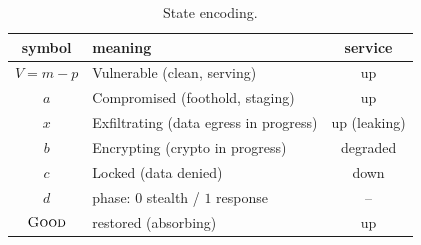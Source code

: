 \documentclass[journal]{IEEEtran}
\begin{document}
\begin{table}[t]
\caption{State encoding.}
\label{tab:states}
\centering\footnotesize
\begin{tabular}{@{}clc@{}}
\toprule
symbol & meaning & service\\
\midrule
$V=m-p$ & Vulnerable (clean, serving) & up\\
$a$ & Compromised (foothold, staging) & up\\
$x$ & Exfiltrating (data egress in progress) & up (leaking)\\
$b$ & Encrypting (crypto in progress) & degraded\\
$c$ & Locked (data denied) & down\\
$d$ & phase: $0$ stealth / $1$ response & --\\
$\textsc{Good}$ & restored (absorbing) & up\\
\bottomrule
\end{tabular}
\end{table}
\end{document}
